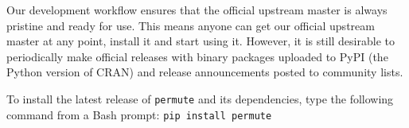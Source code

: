 Our development workflow ensures that the official upstream master is always
pristine and ready for use.  This means anyone can get our official upstream
master at any point, install it and start using it.  However, it is still
desirable to periodically make official releases with binary packages uploaded
to PyPI (the Python version of CRAN) and release announcements posted to
community lists.

To install the latest release of \texttt{permute} and its dependencies, type
the following command from a Bash prompt: \texttt{pip install permute}
